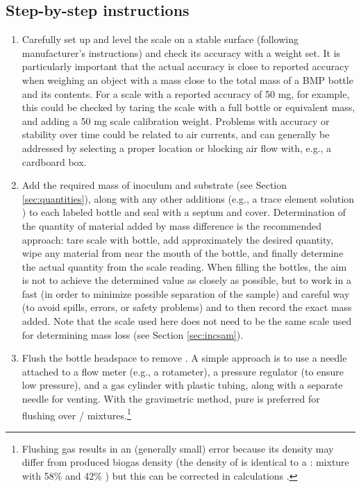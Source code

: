 \documentclass[]{article}
\begin{document}
\subsection{Step-by-step instructions}
\begin{enumerate}
  \item Carefully set up and level the scale on a stable surface (following manufacturer's instructions) and check its accuracy with a weight set. 
      It is particularly important that the actual accuracy is close to reported accuracy when weighing an object with a mass close to the total mass of a BMP bottle and its contents. 
      For a scale with a reported accuracy of 50 mg, for example, this could be checked by taring the scale with a full bottle or equivalent mass, and adding a 50 mg scale calibration weight.
      Problems with accuracy or stability over time could be related to air currents, and can generally be addressed by selecting a proper location or blocking air flow with, e.g., a cardboard box.
    \item Add the required mass of inoculum and substrate (see Section \ref{sec:quantities}), along with any other additions (e.g., a trace element solution \citep{holligerStandardizationBiomethanePotential2016}) to each labeled bottle and seal with a septum and cover. 
      Determination of the quantity of material added by mass difference is the recommended approach: tare scale with bottle, add approximately the desired quantity, wipe any material from near the mouth of the bottle, and finally determine the actual quantity from the scale reading. 
      When filling the bottles, the aim is not to achieve the determined value as closely as possible, but to work in a fast (in order to minimize possible separation of the sample) and careful way (to avoid spills, errors, or safety problems) and to then record the exact mass added.
      Note that the scale used here does not need to be the same scale used for determining mass loss (see Section \ref{sec:incsam}).
    \item Flush the bottle headspace to remove . 
      A simple approach is to use a needle attached to a flow meter (e.g., a rotameter), a pressure regulator (to ensure low pressure), and a gas cylinder with plastic tubing, along with a separate needle for venting. With the gravimetric method, pure  is preferred for flushing over / mixtures.\footnote{
        Flushing gas results in an (generally small) error because its density may differ from produced biogas density (the density of  is identical to a : mixture with 58\%  and 42\% ) but this can be corrected in calculations \citep{justesenDevelopmentValidationLowcost2019}.
}
\end{enumerate}
\end{document}
